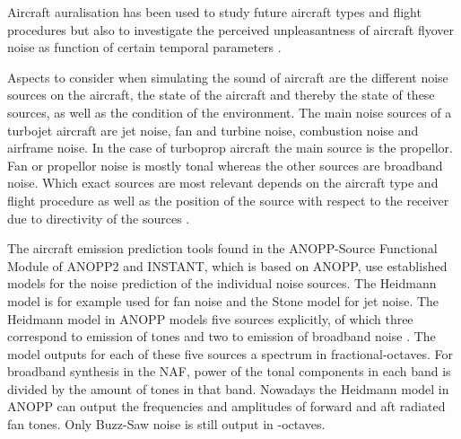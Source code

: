 Aircraft auralisation has been used to study future aircraft types
\cite{Rizzi2013,Rizzi2016,Rizzi2016a} and flight procedures \cite{Sahai2016} but
also to investigate the perceived unpleasantness of aircraft flyover noise as
function of certain temporal parameters \cite{Pate2017}.

Aspects to consider when simulating the sound of aircraft are the different
noise sources on the aircraft, the state of the aircraft and thereby the state
of these sources, as well as the condition of the environment.
The main noise sources of a turbojet aircraft are jet noise, fan and turbine
noise, combustion noise and airframe noise. In the case of turboprop aircraft
the main source is the propellor\cite{Zaporozhets2011}. Fan or propellor noise
is mostly tonal whereas the other sources are broadband noise.
Which exact sources are most relevant depends on the aircraft type and flight
procedure as well as the position of the source with respect to the receiver due
to directivity of the sources \cite{Bertsch2015}.

The aircraft emission prediction tools found in the ANOPP-Source Functional
Module of ANOPP2 \cite{Lopes2016, Tuttle2017} and INSTANT\cite{Sahai2016b}, which is based
on ANOPP, use established models for the noise prediction of the individual
noise sources. The Heidmann model is for example used for fan noise and the
Stone model for jet noise. The Heidmann model in ANOPP models
five sources explicitly, of which three correspond to emission of tones and two
to emission of broadband noise \cite{Arntzen2014a}. The model outputs for each
of these five sources a spectrum in fractional-octaves.
For broadband synthesis in the NAF\cite{Aumann2015}, power of the tonal
components in each band is divided by the amount of tones in that band.
Nowadays the Heidmann model in ANOPP can output the frequencies and amplitudes
of forward and aft radiated fan tones. Only Buzz-Saw noise is still output in
-octaves.



